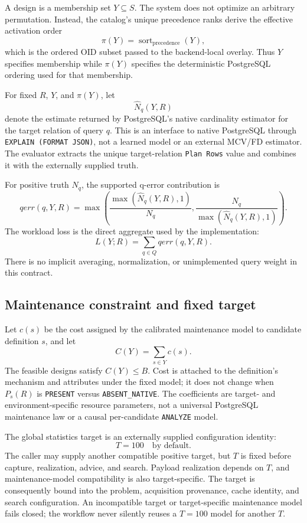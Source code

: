 A design is a membership set $Y\subseteq S$.  The system does not optimize an
arbitrary permutation.  Instead, the catalog's unique precedence ranks derive
the effective activation order
\[
 \pi(Y)=\operatorname{sort}_{\mathrm{precedence}}(Y),
\]
which is the ordered OID subset passed to the backend-local overlay.  Thus $Y$
specifies membership while $\pi(Y)$ specifies the deterministic PostgreSQL
ordering used for that membership.

For fixed $R$, $Y$, and $\pi(Y)$, let
\[
 \widehat{N}_q(Y,R)
\]
denote the estimate returned by PostgreSQL's native cardinality estimator for
the target relation of query $q$.  This is an interface to native PostgreSQL
through \texttt{EXPLAIN (FORMAT JSON)}, not a learned model or an external
MCV/FD estimator.  The evaluator extracts the unique target-relation
\texttt{Plan Rows} value and combines it with the externally supplied truth.

For positive truth $N_q$, the supported q-error contribution is
\[
 qerr(q,Y,R)=
 \max\left(
 \frac{\max(\widehat{N}_q(Y,R),1)}{N_q},
 \frac{N_q}{\max(\widehat{N}_q(Y,R),1)}
 \right).
\]
The workload loss is the direct aggregate used by the implementation:
\[
 L(Y;R)=\sum_{q\in Q} qerr(q,Y,R).
\]
There is no implicit averaging, normalization, or unimplemented query weight
in this contract.

\subsection{Maintenance constraint and fixed target}

Let $c(s)$ be the cost assigned by the calibrated maintenance model to
candidate definition $s$, and let
\[
 C(Y)=\sum_{s\in Y}c(s).
\]
The feasible designs satisfy $C(Y)\le B$.  Cost is attached to the
definition's mechanism and attributes under the fixed model; it does not
change when $P_s(R)$ is \texttt{PRESENT} versus \texttt{ABSENT\_NATIVE}.
The coefficients are target- and environment-specific resource parameters,
not a universal PostgreSQL maintenance law or a causal per-candidate
\texttt{ANALYZE} model.

The global statistics target is an externally supplied configuration identity:
\[
 T=100\quad\text{by default}.
\]
The caller may supply another compatible positive target, but $T$ is fixed
before capture, realization, advice, and search.  Payload realization depends
on $T$, and maintenance-model
compatibility is also target-specific.  The target is consequently bound into
the problem, acquisition provenance, cache identity, and search configuration.
An incompatible target or target-specific maintenance model fails closed;
the workflow never silently reuses a $T=100$ model for another $T$.


